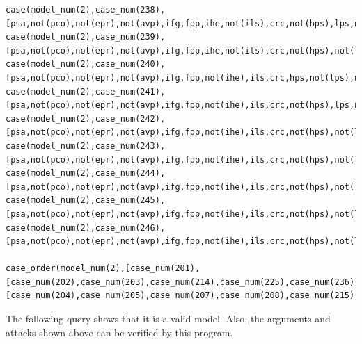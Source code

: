 \documentclass{IOS-Book-Article}
\begin{document}
\begin{lstlisting}
case(model_num(2),case_num(238),[psa,not(pco),not(epr),not(avp),ifg,fpp,ihe,not(ils),crc,not(hps),lps,not(m3fti),not(l3fti),not(cdt),not(fin)]).
case(model_num(2),case_num(239),[psa,not(pco),not(epr),not(avp),ifg,fpp,ihe,not(ils),crc,not(hps),not(lps),m3fti,not(l3fti),not(cdt),fin]).
case(model_num(2),case_num(240),[psa,not(pco),not(epr),not(avp),ifg,fpp,not(ihe),ils,crc,hps,not(lps),not(m3fti),not(l3fti),not(cdt),not(fin)]).
case(model_num(2),case_num(241),[psa,not(pco),not(epr),not(avp),ifg,fpp,not(ihe),ils,crc,not(hps),lps,not(m3fti),not(l3fti),not(cdt),not(fin)]).
case(model_num(2),case_num(242),[psa,not(pco),not(epr),not(avp),ifg,fpp,not(ihe),ils,crc,not(hps),not(lps),not(m3fti),not(l3fti),not(cdt),fin]).
case(model_num(2),case_num(243),[psa,not(pco),not(epr),not(avp),ifg,fpp,not(ihe),ils,crc,not(hps),not(lps),not(m3fti),l3fti,not(cdt),fin,cpb,pbt]).
case(model_num(2),case_num(244),[psa,not(pco),not(epr),not(avp),ifg,fpp,not(ihe),ils,crc,not(hps),not(lps),not(m3fti),not(l3fti),cdt,fin,cpb,pbt]).
case(model_num(2),case_num(245),[psa,not(pco),not(epr),not(avp),ifg,fpp,not(ihe),ils,crc,not(hps),not(lps),not(m3fti),l3fti,not(cdt),fin,not(cpb),not(pbt)]).
case(model_num(2),case_num(246),[psa,not(pco),not(epr),not(avp),ifg,fpp,not(ihe),ils,crc,not(hps),not(lps),not(m3fti),not(l3fti),cdt,fin,not(cpb),not(pbt)]).

case_order(model_num(2),[case_num(201),[case_num(202),case_num(203),case_num(214),case_num(225),case_num(236)],[case_num(204),case_num(205),case_num(207),case_num(208),case_num(215),case_num(216),case_num(218),case_num(219),case_num(226),case_num(227),case_num(229),case_num(230),case_num(237),case_num(238),case_num(240),case_num(241),case_num(206),case_num(209),case_num(210),case_num(211),case_num(212),case_num(213),case_num(217),case_num(220),case_num(221),case_num(222),case_num(223),case_num(224),case_num(228),case_num(231),case_num(232),case_num(233),case_num(234),case_num(235),case_num(239),case_num(242),case_num(243),case_num(244),case_num(245),case_num(246)]]).
\end{lstlisting}

The following query shows that it is a valid model. Also, the arguments and attacks shown above can be verified by this program.
\end{document}

